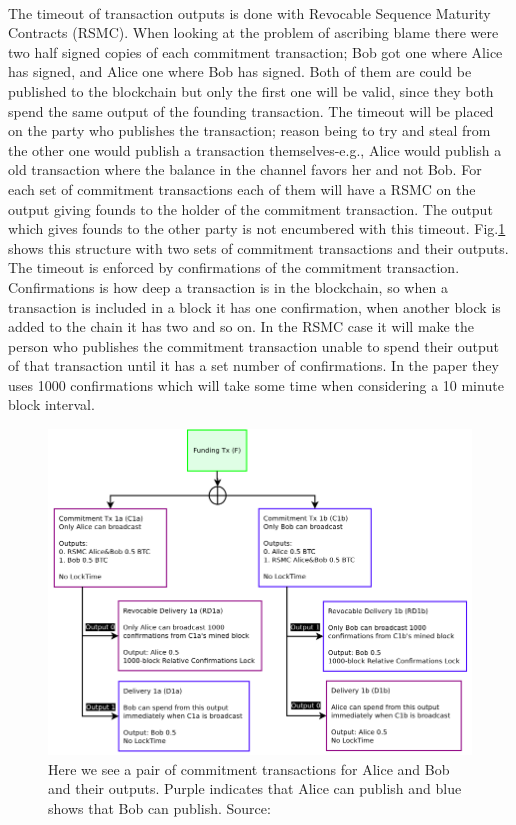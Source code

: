 \paragraph{}
The timeout of transaction outputs is done with Revocable Sequence Maturity Contracts (RSMC). When looking at the problem of ascribing blame there were two half signed copies of each commitment transaction; Bob got one where Alice has signed, and Alice one where Bob has signed. Both of them are could be published to the blockchain but only the first one will be valid, since they both spend the same output of the founding transaction. The timeout will be placed on the party who publishes the transaction; reason being to try and steal from the other one would publish a transaction themselves-e.g., Alice would publish a old transaction where the balance in the channel favors her and not Bob. For each set of commitment transactions each of them will have a RSMC on the output giving founds to the holder of the commitment transaction. The output which gives founds to the other party is not encumbered with this timeout. Fig.\ref{fig:ln_timeout} shows this structure with two sets of commitment transactions and their outputs. The timeout is enforced by confirmations of the commitment transaction. Confirmations is how deep a transaction is in the blockchain, so when a transaction is included in a block it has one confirmation, when another block is added to the chain it has two and so on\cite{antonopoulos2017mastering}. In the RSMC case it will make the person who publishes the commitment transaction unable to spend their output of that transaction until it has a set number of confirmations. In the paper they uses 1000 confirmations which will take some time when considering a 10 minute block interval.

\begin{figure}[h]
    \centering
    \includegraphics[width=12cm]{figures/ln_timeout.png}
    \caption{Here we see a pair of commitment transactions for Alice and Bob and their outputs. Purple indicates that Alice can publish and blue shows that Bob can publish. Source: \cite{poon2015bitcoin}}
    \label{fig:ln_timeout}
\end{figure}

